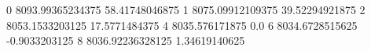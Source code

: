 0 8093.99365234375 58.41748046875
1 8075.09912109375 39.52294921875
2 8053.1533203125 17.5771484375
4 8035.576171875 0.0
6 8034.6728515625 -0.9033203125
8 8036.92236328125 1.34619140625
